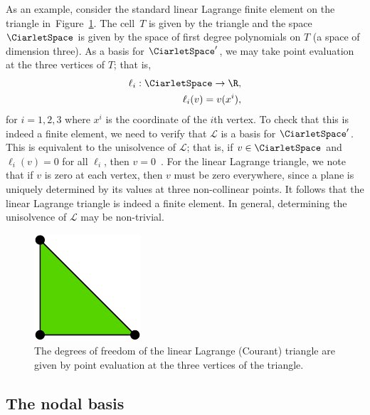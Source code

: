 As an example, consider the standard linear Lagrange finite element on
the triangle in~Figure~\ref{fig:P1}. The cell~$T$ is given by the
triangle and the space $\CiarletSpace$ is given by the space of first
degree polynomials on $T$ (a space of dimension three). As a basis for
$\CiarletSpace'$, we may take point evaluation at the three vertices
of $T$; that is,
\begin{equation}
  \begin{split}
    \ell_i : \CiarletSpace \rightarrow \R, \\
    \ell_i(v) = v(x^i),
  \end{split}
\end{equation}
for $i=1,2,3$ where $x^i$ is the coordinate of the $i$th vertex. To
check that this is indeed a finite element, we need to verify that
$\mathcal{L}$ is a basis for $\CiarletSpace'$. This is equivalent to
the unisolvence of $\mathcal{L}$; that is, if $v\in\CiarletSpace$ and
$\ell_i(v) = 0$ for all $\ell_i$, then $v =
0$~\citep{BrennerScott2008}. For the linear Lagrange triangle, we note
that if $v$ is zero at each vertex, then $v$ must be zero everywhere,
since a plane is uniquely determined by its values at three
non-collinear points. It follows that the linear Lagrange triangle is
indeed a finite element. In general, determining the unisolvence of
$\mathcal{L}$ may be non-trivial.

\begin{figure}
  \begin{center}
    \includegraphics[width=\smallfig]{chapters/kirby-7/pdf/P1.pdf}
    \caption{The degrees of freedom of the linear Lagrange (Courant)
      triangle are given by point evaluation at the three vertices of
      the triangle.}
    \label{fig:P1}
  \end{center}
\end{figure}

\subsection{The nodal basis}

